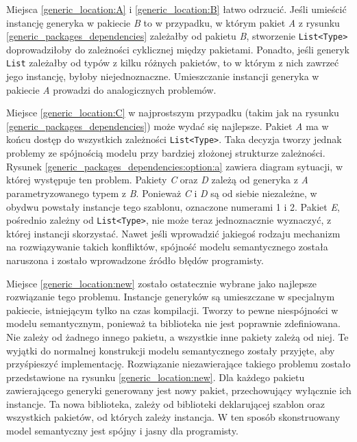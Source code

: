 Miejsca \ref{generic_location:A} i \ref{generic_location:B} łatwo odrzucić.
Jeśli umieścić instancję generyka w pakiecie \emph{B} to w przypadku, w którym pakiet \emph{A} z rysunku \ref{generic_packages_dependencies} zależałby od pakietu \emph{B}, stworzenie \lstinline{List<Type>} doprowadziłoby do zależności cyklicznej między pakietami.
Ponadto, jeśli generyk \lstinline{List} zależałby od typów z kilku różnych pakietów, to w którym z nich zawrzeć jego instancję, byłoby niejednoznaczne.
Umieszczanie instancji generyka w pakiecie \emph{A} prowadzi do analogicznych problemów.

Miejsce \ref{generic_location:C} w najprostszym przypadku (takim jak na rysunku \ref{generic_packages_dependencies}) może wydać się najlepsze.
Pakiet \emph{A} ma w końcu dostęp do wszystkich zależności \lstinline{List<Type>}.
Taka decyzja tworzy jednak problemy ze spójnością modelu przy bardziej złożonej strukturze zależności.
Rysunek \ref{generic_packages_dependencies:option:a} zawiera diagram sytuacji, w której występuje ten problem.
Pakiety \emph{C} oraz \emph{D} zależą od generyka z \emph{A} parametryzowanego typem z \emph{B}.
Ponieważ \emph{C} i \emph{D} są od siebie niezależne, w obydwu powstały instancje tego szablonu, oznaczone numerami 1 i 2.
Pakiet \emph{E}, pośrednio zależny od \lstinline{List<Type>}, nie może teraz jednoznacznie wyznaczyć, z której instancji skorzystać.
Nawet jeśli wprowadzić jakiegoś rodzaju mechanizm na rozwiązywanie takich konfliktów, spójność modelu semantycznego została naruszona i zostało wprowadzone źródło błędów programisty.

Miejsce \ref{generic_location:new} zostało ostatecznie wybrane jako najlepsze rozwiązanie tego problemu.
Instancje generyków są umieszczane w specjalnym pakiecie, istniejącym tylko na czas kompilacji.
Tworzy to pewne niespójności w modelu semantycznym, ponieważ ta biblioteka nie jest poprawnie zdefiniowana.
Nie zależy od żadnego innego pakietu, a wszystkie inne pakiety zależą od niej.
Te wyjątki do normalnej konstrukcji modelu semantycznego zostały przyjęte, aby przyśpieszyć implementację.
Rozwiązanie niezawierające takiego problemu zostało przedstawione na rysunku \ref{generic_location:new}.
Dla każdego pakietu zawierającego generyki generowany jest nowy pakiet, przechowujący wyłącznie ich instancje.
Ta nowa biblioteka, zależy od biblioteki deklarującej szablon oraz wszystkich pakietów, od których zależy instancja.
W ten sposób skonstruowany model semantyczny jest spójny i jasny dla programisty.

